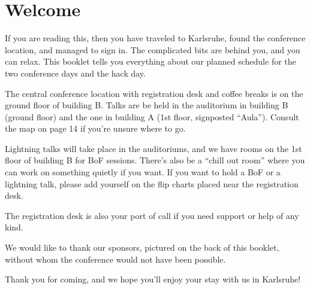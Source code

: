 \newpage
\section*{Welcome} \label{welcome}
If you are reading this, then you have traveled to
Karls\-ruhe, found the conference location, and managed to
sign in. The complicated bits are behind you, and
you can relax. This booklet tells you everything about our planned
schedule for the two conference days and the hack day.

The central conference location with registration desk and
coffee breaks is on the ground floor of building B. Talks are
be held in the auditorium in building B (ground floor) and
the one in building A (1st floor, signposted ``Aula''). Consult 
the map on page 14 if you're unsure where to go.

Lightning talks will take place in the auditoriums, 
and we have rooms on
the 1st floor of building B for BoF sessions. There's also be a ``chill out
room'' where you can work on something quietly if you
want. If you want to hold a BoF or a lightning talk, please
add yourself on the flip charts placed
near the registration desk.

The registration desk is also your port of call if you need
support or help of any kind. 

\vspace{0.4em}

We would like to thank our sponsors, pictured on the back
of this booklet, without whom the conference would not
have been possible.

\vspace{0.4em}
Thank you for coming, and we hope you'll enjoy your stay with us in Karlsruhe!

